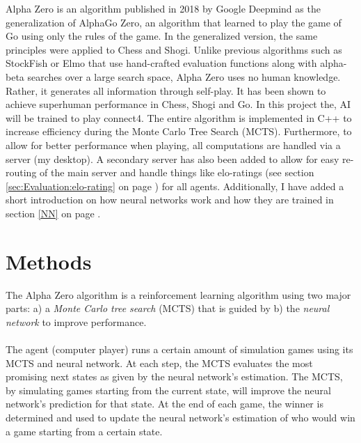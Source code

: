 \documentclass[12pt]{article}
\newcommand{\sectionref}[1]{section \ref{#1} on page \pageref{#1}}
\begin{document}
\maketitle
\begin{abstract}
\noindent Alpha Zero is an AI algorythem, that is capable of learning to play zero sum stated multiplayer games. These types of games include Go, Chess, Phi Sho and so forth. This is done by training a neural network and from data generated by a Monte Carlo Tree Serch. This document also explains how neural networks work and a short explenation of the infrastructure around the AI to allow for playing on remote devices.
~\cite{silver2018general}\cite{silver2017mastering}
\end{abstract}
\tableofcontents
\newpage

Alpha Zero is an algorithm published in 2018 by Google Deepmind as the generalization of AlphaGo Zero, an algorithm that learned to play the game of Go using only the rules of the game. In the generalized version, the same principles were applied to Chess and Shogi. Unlike previous algorithms such as StockFish or Elmo that use hand-crafted evaluation functions along with alpha-beta searches over a large search space, Alpha Zero uses no human knowledge. Rather, it generates all information through self-play. It has been shown to achieve superhuman performance in Chess, Shogi and Go. In this project the, AI will be trained to play connect4. The entire algorithm is implemented in C++ to increase efficiency during the Monte Carlo Tree Search (MCTS). Furthermore, to allow for better performance when playing, all computations are handled via a server (my desktop). A secondary server has also been added to allow for easy re-routing of the main server and handle things like elo-ratings (see \sectionref{sec:Evaluation:elo-rating}) for all agents. Additionally, I have added a short introduction on how neural networks work and how they are trained in \sectionref{NN}. 

\section{Methods}
\label{Methods}
The Alpha Zero algorithm is a reinforcement learning algorithm using two major parts: a) a {\it Monte Carlo tree search} (MCTS) that is guided by b) the {\it neural network} to improve performance. \\\\
The agent (computer player) runs a certain amount of simulation games using its MCTS and neural network. At each step, the MCTS evaluates the most promising next states as given by the neural network's estimation. The MCTS, by simulating games starting from the current state, will improve the neural network's prediction for that state. At the end of each game, the winner is determined and used to update the neural network's estimation of who would win a game starting from a certain state.
\end{document}
